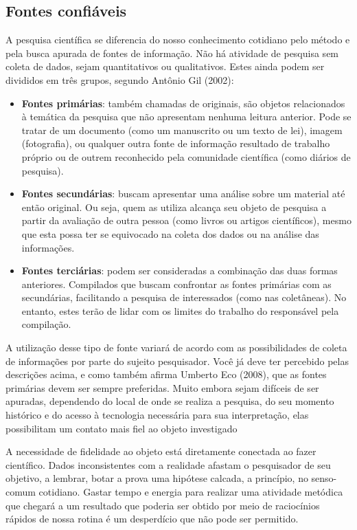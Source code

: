 \subsection{Fontes confiáveis}


A pesquisa científica se diferencia do nosso conhecimento cotidiano pelo método e pela busca apurada de fontes de informação. Não há atividade de pesquisa sem coleta de dados, sejam quantitativos ou qualitativos. Estes ainda podem ser divididos em três grupos, segundo Antônio Gil (2002):

\begin{itemize}
\item \textbf{Fontes primárias}: também chamadas de originais, são objetos relacionados à temática da pesquisa que não apresentam nenhuma leitura anterior. Pode se tratar de um documento (como um manuscrito ou um texto de lei), imagem (fotografia), ou qualquer outra fonte de informação resultado de trabalho próprio ou de outrem reconhecido pela comunidade científica (como diários de pesquisa).
\item \textbf{Fontes secundárias}: buscam apresentar uma análise sobre um material até então original. Ou seja, quem as utiliza alcança seu objeto de pesquisa a partir da avaliação de outra pessoa (como livros ou artigos científicos), mesmo que esta possa ter se equivocado na coleta dos dados ou na análise das informações.
\item \textbf{Fontes terciárias}: podem ser consideradas a combinação das duas formas anteriores. Compilados que buscam confrontar as fontes primárias com as secundárias, facilitando a pesquisa de interessados (como nas coletâneas). No entanto, estes terão de lidar com os limites do trabalho do responsável pela compilação.
\end{itemize}

A utilização desse tipo de fonte variará de acordo com as possibilidades de coleta de informações por parte do sujeito pesquisador. Você já deve ter percebido pelas descrições acima, e como também afirma Umberto Eco (2008), que as fontes primárias devem ser sempre preferidas. Muito embora sejam difíceis de ser apuradas, dependendo do local de onde se realiza a pesquisa, do seu momento histórico e do acesso à tecnologia necessária para sua interpretação, elas possibilitam um contato mais fiel ao objeto investigado

A necessidade de fidelidade ao objeto está diretamente conectada ao fazer científico. Dados inconsistentes com a realidade afastam o pesquisador de seu objetivo, a lembrar, botar a prova uma hipótese calcada, a princípio, no senso-comum cotidiano. Gastar tempo e energia para realizar uma atividade metódica que chegará a um resultado que poderia ser obtido por meio de raciocínios rápidos de nossa rotina é um desperdício que não pode ser permitido.

